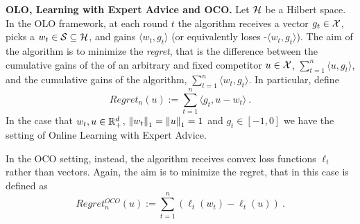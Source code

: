 \vspace{0.2cm}\noindent\textbf{\ac{OLO}, Learning with Expert Advice and \ac{OCO}.}
Let $\mathcal{H}$ be a Hilbert space. In the \ac{OLO} framework, at each round $t$ the algorithm receives a vector $g_t \in \mathcal{X}$, picks a $w_t \in \mathcal{S} \subseteq \mathcal{H}$, and gains $\langle w_t,g_t \rangle$ (or equivalently loses -$\langle w_t,g_t \rangle$).
The aim of the algorithm is to minimize the \emph{regret}, that is the difference between the cumulative gains of the 
of an arbitrary and fixed competitor $u \in \mathcal{X}$, $\sum_{t=1}^n \langle u,g_t \rangle$, and 
the cumulative gains of the algorithm, $\sum_{t=1}^n \langle w_t,g_t \rangle$.
In particular, define
\[
Regret_n(u) := \sum_{t=1}^n \langle g_t , u - w_t \rangle~.
\]
In the case that $w_t, u \in \mathbb{R}^d_+$, $\left\|{w_t}\right\|_1=\left\|{u}\right\|_1=1$ and $g_t \in [-1,0]$ we have the setting of Online Learning with Expert Advice.

In the \ac{OCO} setting, instead, the algorithm receives convex loss functions $\ell_t$ rather than vectors.
Again, the aim is to minimize the regret, that in this case is defined as
\[
Regret^{OCO}_n(u) := \sum_{t=1}^n \left(\ell_t(w_t) -\ell_t(u)\right)~.
\]

